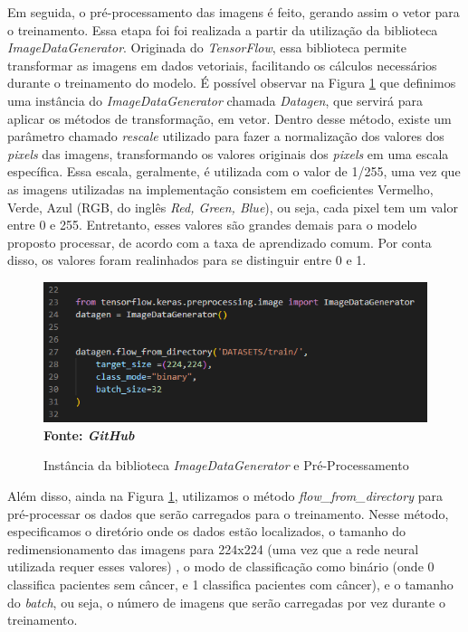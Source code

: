 Em seguida, o pré-processamento das imagens é feito, gerando assim o vetor para o treinamento. Essa etapa foi foi realizada a partir da utilização da biblioteca \textit{ImageDataGenerator}. Originada do \textit{TensorFlow}, essa biblioteca permite transformar as imagens em dados vetoriais, facilitando os cálculos necessários durante o treinamento do modelo. É possível observar na Figura \ref{fig:generator} que definimos uma instância do \textit{ImageDataGenerator} chamada \textit{Datagen}, que servirá para aplicar os métodos de transformação, em vetor. Dentro desse método, existe um parâmetro chamado \textit{rescale} utilizado para fazer a normalização dos valores dos \textit{pixels} das imagens, transformando os valores originais dos \textit{pixels} em uma escala específica. Essa escala, geralmente, é utilizada com o valor de 1/255, uma vez que as imagens utilizadas na implementação consistem em coeficientes Vermelho, Verde, Azul (RGB, do inglês \textit{Red, Green, Blue}), ou seja, cada pixel tem um valor entre 0 e 255. Entretanto, esses valores são grandes demais para o modelo proposto processar, de acordo com a taxa de aprendizado comum. Por conta disso, os valores foram realinhados para se distinguir entre 0 e 1.

 \begin{figure}[ht]
 	\centering	
 	\caption[\hspace{0.1cm}Grade Computacional.]{Instância da biblioteca \textit{ImageDataGenerator} e Pré-Processamento}
 	\vspace{-0.4cm}
 	\includegraphics[width=1\textwidth]{figuras/imggenerator.png}
 	\captionsetup{justification=centering}
	\vspace{-0.2cm}
     \\\textbf{\footnotesize Fonte: \textit{GitHub}}
	\label{fig:generator}
\end{figure}


Além disso, ainda na Figura \ref{fig:generator}, utilizamos o método \textit{flow\_from\_directory} para pré-processar os dados que serão carregados para o treinamento. Nesse método, especificamos o diretório onde os dados estão localizados, o tamanho do redimensionamento das imagens para 224x224 (uma vez que a rede neural utilizada requer esses valores) , o modo de classificação como binário (onde 0 classifica pacientes sem câncer, e 1 classifica pacientes com câncer), e o tamanho do \textit{batch}, ou seja, o número de imagens que serão carregadas por vez durante o treinamento.


